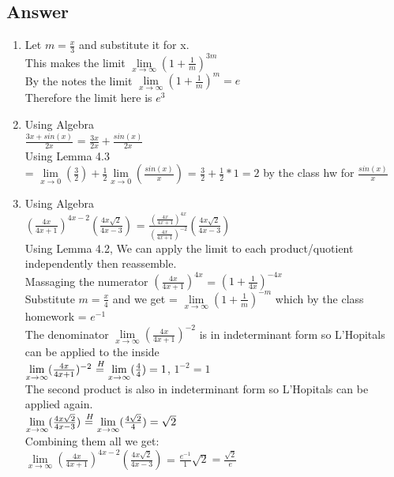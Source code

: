 \documentclass{article}
\newcommand\tab[1][1cm]{\hspace*{#1}}
\newcommand*\Heq{\ensuremath{\overset{\kern2pt H}{=}}}
\begin{document}
\subsection*{Answer}
\begin{enumerate}[label=(\alph*)]
	\item \tab Let \(m = \frac{x}{3}\) and substitute it for x.\\
	         \tab This makes the limit \(\lim\limits_{x \to \infty}(1 + \frac{1}{m})^{3m}\) \\
	         \tab By the notes the limit \(\lim\limits_{x \to \infty}(1+ \frac{1}{m})^{m} = e\) \\
	         \tab Therefore the limit here is \(e^{3}\)
	\item 
	Using Algebra \\
	         \tab \(\frac{3x + sin(x)}{2x}\) = \(\frac{3x}{2x} + \frac{sin(x)}{2x}\) \\
	Using Lemma 4.3 \\
	        \tab = \(\lim\limits_{x \to 0}(\frac{3}{2}) + \frac{1}{2}\lim\limits_{x \to 0}(\frac{sin(x)}{x})\)
	        \tab = \(\frac{3}{2} + \frac{1}{2} * 1 = 2\) by the class hw for \(\frac{sin(x)}{x}\)
	\item
	Using Algebra \\
		\tab    \((\frac{4x}{4x+1})^{4x-2}(\frac{4x\sqrt{2}}{4x-3})\) = 
			\(\frac{(\frac{4x}{4x+1})^{4x}}{(\frac{4x}{4x+1})^{-2}}\)\((\frac{4x\sqrt{2}}{4x-3})\) \\
	Using Lemma 4.2, We can apply the limit to each product/quotient independently then reassemble. \\
		\tab 	 Massaging the numerator \((\frac{4x}{4x+1})^{4x}\) = \((1 + \frac{1}{4x})^{-4x}\) \\
		\tab 	Substitute \(m = \frac{x}{4}\) and we get = \(\lim\limits_{x \to \infty}(1 + \frac{1}{m})^{-m}\) which by
		           the class homework = \(e^{-1}\) \\
		\tab 	The denominator \(\lim\limits_{x\to \infty}(\frac{4x}{4x+1})^{-2}\) is in indeterminant form so
			 L'Hopitals can be applied to the inside \\
		\tab 	\(\lim\limits_{x\to \infty}(\frac{4x}{4x+1})^{-2} \Heq \lim\limits_{x\to \infty} (\frac{4}{4}) = 1\), \(1 ^{-2} = 1\) 
\\		\tab 	The second product is also in indeterminant form so L'Hopitals can be applied again. \\
		\tab 	\(\lim\limits_{x \to \infty}(\frac{4x\sqrt{2}}{4x-3}) \Heq \lim\limits_{x \to \infty}(\frac{4\sqrt{2}}{4})
			 = \sqrt{2}\)\\
	Combining them all we get: \\
	\(\lim\limits_{x \to \infty}(\frac{4x}{4x+1})^{4x-2}(\frac{4x\sqrt{2}}{4x-3})\) = \(\frac{e^{-1}}{1}\sqrt{2} 
	= \frac{\sqrt{2}}{e}\)
\end{enumerate}	
\clearpage
\end{document}
